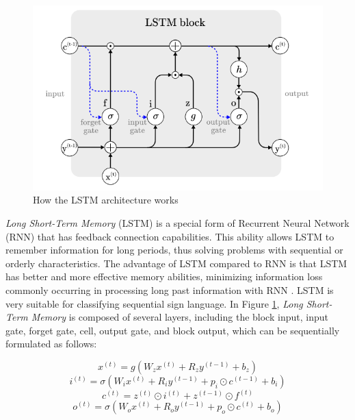 \begin{figure}[ht]
    \centering
    \includegraphics[scale=0.5]{gambar/bab2-lstm-model.png}
    \caption{How the LSTM architecture works}
    \label{fig:longshortterm}
\end{figure}

\emph{Long Short-Term Memory} (LSTM) is a special form of Recurrent Neural Network (RNN) that has feedback connection capabilities. This ability allows LSTM to remember information for long periods, thus solving problems with sequential or orderly characteristics. The advantage of LSTM compared to RNN is that LSTM has better and more effective memory abilities, minimizing information loss commonly occurring in processing long past information with RNN \cite{xia2020}. LSTM is very suitable for classifying sequential sign language. In Figure \ref{fig:longshortterm}, \emph{Long Short-Term Memory} is composed of several layers, including the block input, input gate, forget gate, cell, output gate, and block output, which can be sequentially formulated as follows:

\begin{equation}
    \label{eq:blockinputLSTM}
    x^{(t)} = g(W_z x^{(t)} + R_z y^{(t-1)} + b_z)
\end{equation}
\vspace{5mm}
\begin{equation}
    \label{eq:inputgateLSTM}
    i^{(t)} = \sigma(W_i x^{(t)} + R_i y^{(t-1)}+ p_i \odot c^{(t-1)} + b_i)
\end{equation}
\vspace{5mm}
\begin{equation}
    \label{eq:cellLSTM}
    c^{(t)} =  z^{(t)} \odot  i^{(t)} + z^{(t-1)} \odot  f^{(t)}
\end{equation}
\vspace{5mm}
\begin{equation}
    \label{eq:outputgateLSTM}
    o^{(t)} = \sigma(W_o x^{(t)} + R_o y^{(t-1)}+ p_o \odot c^{(t)} + b_o)
\end{equation}


